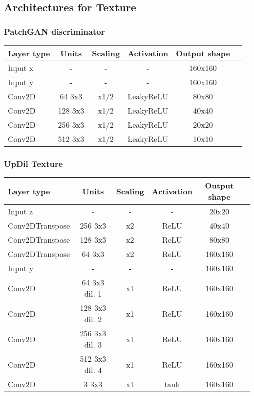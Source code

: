 {\subsection{Architectures for Texture}

\subsubsection{PatchGAN discriminator}
{
	\centering
	\begin{tabular}{|l|c|c|c|c|c|}
		\hline
		Layer type & Units & Scaling & Activation & Output shape\\
		\hline
		Input x & - & - & - & 160x160\\
		Input y & - & - & - & 160x160\\
		Conv2D & 64 3x3 & x1/2 & LeakyReLU & 80x80 \\
		Conv2D & 128 3x3 & x1/2 & LeakyReLU & 40x40 \\
		Conv2D & 256 3x3 & x1/2 & LeakyReLU & 20x20 \\
		Conv2D & 512 3x3 & x1/2 & LeakyReLU &  10x10\\
		\hline
	\end{tabular}
} 

\subsubsection{UpDil Texture}
{
	\centering
	\begin{tabular}{|l|c|c|c|c|c|}
		\hline
		Layer type & Units & Scaling & Activation & Output shape\\
		\hline
		Input z & - & - & - & 20x20 \\
		Conv2DTranspose & 256 3x3 & x2 & ReLU & 40x40 \\
		Conv2DTranspose & 128 3x3 & x2 & ReLU & 80x80 \\
		Conv2DTranspose & 64 3x3 & x2 & ReLU & 160x160 \\
		Input y & - & - & - & 160x160\\
		Conv2D & 64 3x3 dil. 1 & x1 & ReLU & 160x160 \\
		Conv2D & 128 3x3  dil. 2 & x1 & ReLU & 160x160 \\
		Conv2D & 256 3x3 dil. 3 & x1 & ReLU & 160x160 \\
		Conv2D & 512 3x3  dil. 4& x1 & ReLU & 160x160 \\
		Conv2D & 3 3x3 & x1 & tanh & 160x160 \\
		\hline
	\end{tabular}
}

}
